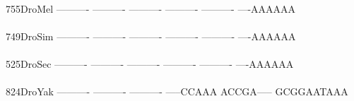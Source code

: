 \documentclass[11pt,twoside,reqno,a4paper]{article}
\begin{document}
{\\
755\hspace*{2\charwidth}DroMel	----------	----------	----------	----------	----------	----AAAAAA	\\
\hspace*{5\charwidth}\hspace*{7\charwidth}\hspace*{1\charwidth}\hspace*{1\charwidth}\hspace*{1\charwidth}\hspace*{1\charwidth}\hspace*{1\charwidth}\hspace*{1\charwidth}\\
749\hspace*{2\charwidth}DroSim	----------	----------	----------	----------	----------	----AAAAAA	\\
\hspace*{5\charwidth}\hspace*{7\charwidth}\hspace*{1\charwidth}\hspace*{1\charwidth}\hspace*{1\charwidth}\hspace*{1\charwidth}\hspace*{1\charwidth}\hspace*{1\charwidth}\\
525\hspace*{2\charwidth}DroSec	----------	----------	----------	----------	----------	----AAAAAA	\\
\hspace*{5\charwidth}\hspace*{7\charwidth}\hspace*{1\charwidth}\hspace*{1\charwidth}\hspace*{1\charwidth}\hspace*{1\charwidth}\hspace*{1\charwidth}\hspace*{1\charwidth}\\
824\hspace*{2\charwidth}DroYak	----------	----------	----------	-----CCAAA	ACCGA-----	GCGGAATAAA	\\
\hspace*{5\charwidth}\hspace*{7\charwidth}\hspace*{1\charwidth}\hspace*{1\charwidth}\hspace*{1\charwidth}\hspace*{1\charwidth}\hspace*{1\charwidth}\hspace*{1\charwidth}\\
}
\end{document}
